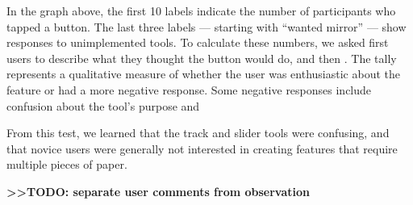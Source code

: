 In the graph above, the first 10 labels indicate the number of
participants who tapped a button. The last three labels --- starting
with ``wanted mirror'' --- show responses to unimplemented tools. To
calculate these numbers, we asked first users to describe what they
thought the button would do, and then . The tally represents a
qualitative measure of whether the user was enthusiastic about the
feature or had a more negative response. Some negative responses include
confusion about the tool's purpose and

From this test, we learned that the track and slider tools were
confusing, and that novice users were generally not interested in
creating features that require multiple pieces of paper.

\textbf{\textgreater{}\textgreater{}TODO: separate user comments from
observation}

